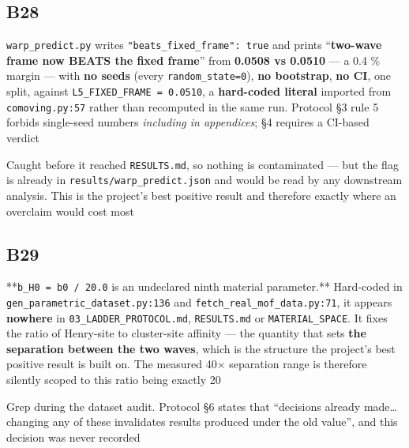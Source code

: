 \documentclass[10pt]{article}
\begin{document}
\subsection*{B28}\label{led:B28}
\begin{description}[leftmargin=0pt,itemsep=1pt]
\item[Defect.] \texttt{warp\_predict.py} writes \texttt{"beats\_fixed\_frame": true} and prints ``\textbf{two-wave frame now BEATS the fixed frame}'' from \textbf{0.0508 vs 0.0510} --- a 0.4 \% margin --- with \textbf{no seeds} (every \texttt{random\_state=0}), \textbf{no bootstrap}, \textbf{no CI}, one split, against \texttt{L5\_FIXED\_FRAME = 0.0510}, a \textbf{hard-coded literal} imported from \texttt{comoving.py:57} rather than recomputed in the same run. Protocol §3 rule 5 forbids single-seed numbers \emph{including in appendices}; §4 requires a CI-based verdict
\item[How it was caught.] Caught before it reached \texttt{RESULTS.md}, so nothing is contaminated --- but the flag is already in \texttt{results/warp\_predict.json} and would be read by any downstream analysis. This is the project's best positive result and therefore exactly where an overclaim would cost most
\end{description}
\subsection*{B29}\label{led:B29}
\begin{description}[leftmargin=0pt,itemsep=1pt]
\item[Defect.] **\texttt{b\_H0 = b0 / 20.0} is an undeclared ninth material parameter.** Hard-coded in \texttt{gen\_parametric\_dataset.py:136} and \texttt{fetch\_real\_mof\_data.py:71}, it appears \textbf{nowhere} in \texttt{03\_LADDER\_PROTOCOL.md}, \texttt{RESULTS.md} or \texttt{MATERIAL\_SPACE}. It fixes the ratio of Henry-site to cluster-site affinity --- the quantity that sets \textbf{the separation between the two waves}, which is the structure the project's best positive result is built on. The measured 40$\times$ separation range is therefore silently scoped to this ratio being exactly 20
\item[How it was caught.] Grep during the dataset audit. Protocol §6 states that ``decisions already made\ldots{} changing any of these invalidates results produced under the old value'', and this decision was never recorded
\end{description}
\end{document}
